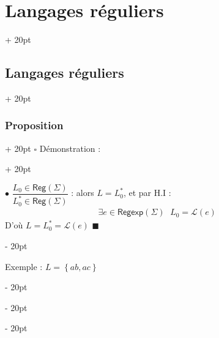 \documentclass[a4paper, 12pt, twoside]{article}
\newcommand{\set}[1]{\left\{ #1 \right\}}
\newcommand{\ind}[1][20pt]{\advance\leftskip + #1}
\newcommand{\deind}[1][20pt]{\advance\leftskip - #1}
\newenvironment{indt}[2][20pt]{#2 \par \ind[#1]}{\par \deind} %
\newenvironment{proof}[1][{Démonstration :}]{\begin{indt}{$\square$ #1}}{$\blacksquare$ \end{indt}}
\newcommand{\Reg}{\mathsf{Reg}}
\newcommand{\Regexp}{\mathsf{Regexp}}
\begin{document}
\begin{indt}{\section{Langages réguliers}}
\begin{indt}{\subsection{Langages réguliers}}
\begin{indt}{\subsubsection{Proposition}}
\begin{proof}
                    \vspace{6pt}
                    
                    $\bullet$ $\dfrac{L_0 \in \Reg(\Sigma)}{L_0^* \in \Reg(\Sigma)}$ : alors $L = L_0^*$, et par H.I :
                    \[
                        \exists e \in \Regexp(\Sigma)\
                        \begin{array}{|l}
                            L_0 = \mathcal L(e)
                        \end{array}
                    \]
                    D'où $L = L_0^* = \mathcal L(e)$
                \end{proof}

                \vspace{12pt}
                
                Exemple : $L = \set{ab, ac}$


\end{indt}
\end{indt}
\end{indt}
\end{document}
